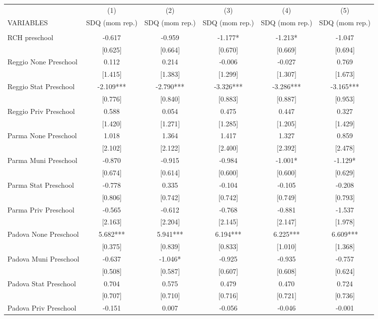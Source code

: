 \begin{tabular}{lccccc} \hline
 & (1) & (2) & (3) & (4) & (5) \\
VARIABLES & SDQ (mom rep.) & SDQ (mom rep.) & SDQ (mom rep.) & SDQ (mom rep.) & SDQ (mom rep.) \\ \hline
 &  &  &  &  &  \\
RCH preschool & -0.617 & -0.959 & -1.177* & -1.213* & -1.047 \\
 & [0.625] & [0.664] & [0.670] & [0.669] & [0.694] \\
Reggio None Preschool & 0.112 & 0.214 & -0.006 & -0.027 & 0.769 \\
 & [1.415] & [1.383] & [1.299] & [1.307] & [1.673] \\
Reggio Stat Preschool & -2.109*** & -2.790*** & -3.326*** & -3.286*** & -3.165*** \\
 & [0.776] & [0.840] & [0.883] & [0.887] & [0.953] \\
Reggio Priv Preschool & 0.588 & 0.054 & 0.475 & 0.447 & 0.327 \\
 & [1.420] & [1.271] & [1.285] & [1.205] & [1.429] \\
Parma None Preschool & 1.018 & 1.364 & 1.417 & 1.327 & 0.859 \\
 & [2.102] & [2.122] & [2.400] & [2.392] & [2.478] \\
Parma Muni Preschool & -0.870 & -0.915 & -0.984 & -1.001* & -1.129* \\
 & [0.674] & [0.614] & [0.600] & [0.600] & [0.629] \\
Parma Stat Preschool & -0.778 & 0.335 & -0.104 & -0.105 & -0.208 \\
 & [0.806] & [0.742] & [0.742] & [0.749] & [0.793] \\
Parma Priv Preschool & -0.565 & -0.612 & -0.768 & -0.881 & -1.537 \\
 & [2.163] & [2.204] & [2.145] & [2.147] & [1.978] \\
Padova None Preschool & 5.682*** & 5.941*** & 6.194*** & 6.225*** & 6.609*** \\
 & [0.375] & [0.839] & [0.833] & [1.010] & [1.368] \\
Padova Muni Preschool & -0.637 & -1.046* & -0.925 & -0.935 & -0.757 \\
 & [0.508] & [0.587] & [0.607] & [0.608] & [0.624] \\
Padova Stat Preschool & 0.704 & 0.575 & 0.479 & 0.470 & 0.724 \\
 & [0.707] & [0.710] & [0.716] & [0.721] & [0.736] \\
Padova Priv Preschool & -0.151 & 0.007 & -0.056 & -0.046 & -0.001 \\

\end{tabular}

